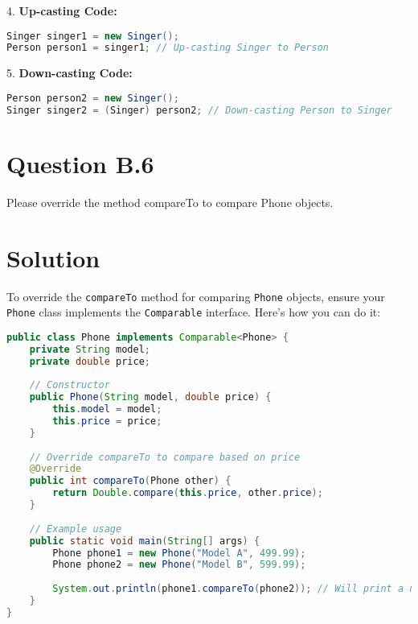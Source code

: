 \documentclass[12pt]{article}
\begin{document}
4. \textbf{Up-casting Code:}
\begin{lstlisting}[language=Java]
Singer singer1 = new Singer();
Person person1 = singer1; // Up-casting Singer to Person
\end{lstlisting}

5. \textbf{Down-casting Code:}
\begin{lstlisting}[language=Java]
Person person2 = new Singer();
Singer singer2 = (Singer) person2; // Down-casting Person to Singer
\end{lstlisting}

\newpage


\section*{Question B.6}
Please override the method compareTo to compare Phone objects.

\section*{Solution}
To override the \texttt{compareTo} method for comparing \texttt{Phone} objects, ensure your \texttt{Phone} class implements the \texttt{Comparable} interface. Here's how you can do it:

\begin{lstlisting}[language=Java]
public class Phone implements Comparable<Phone> {
    private String model;
    private double price;
    
    // Constructor
    public Phone(String model, double price) {
        this.model = model;
        this.price = price;
    }
    
    // Override compareTo to compare based on price
    @Override
    public int compareTo(Phone other) {
        return Double.compare(this.price, other.price);
    }
    
    // Example usage
    public static void main(String[] args) {
        Phone phone1 = new Phone("Model A", 499.99);
        Phone phone2 = new Phone("Model B", 599.99);
        
        System.out.println(phone1.compareTo(phone2)); // Will print a negative value since phone1 is cheaper
    }
}
\end{lstlisting}
\end{document}
